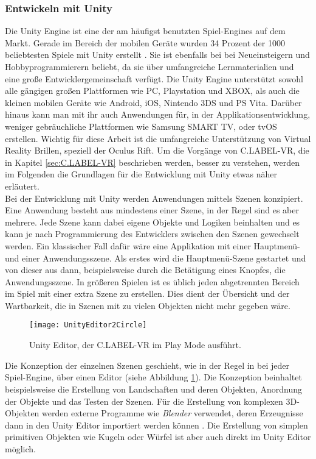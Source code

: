\subsubsection{Entwickeln mit Unity}

Die Unity Engine ist eine der am häufigst benutzten Spiel-Engines auf dem Markt. Gerade im Bereich der mobilen Geräte wurden 34 Prozent der 1000 beliebtesten Spiele mit Unity erstellt \cite{bib:Unity34Percent}. Sie ist ebenfalls bei bei Neueinsteigern und Hobbyprogrammierern beliebt, da sie über umfangreiche Lernmaterialien und eine große Entwicklergemeinschaft verfügt. Die Unity Engine unterstützt sowohl alle gängigen großen Plattformen wie PC, Playstation und XBOX, als auch die kleinen mobilen Geräte wie Android, iOS, Nintendo 3DS und PS Vita. Darüber hinaus kann man mit ihr auch Anwendungen für, in der Applikationsentwicklung, weniger gebräuchliche Plattformen wie Samsung SMART TV, oder tvOS erstellen. Wichtig für diese Arbeit ist die umfangreiche Unterstützung von Virtual Reality Brillen, speziell der Oculus Rift. Um die Vorgänge von C.LABEL-VR, die in Kapitel \ref{sec:C.LABEL-VR} beschrieben werden, besser zu verstehen, werden im Folgenden die Grundlagen für die Entwicklung mit Unity etwas näher erläutert.\\ 

Bei der Entwicklung mit Unity werden Anwendungen mittels Szenen konzipiert. Eine Anwendung besteht aus mindestens einer Szene, in der Regel sind es aber mehrere. Jede Szene kann dabei eigene Objekte und Logiken beinhalten und es kann je nach Programmierung des Entwicklers zwischen den Szenen gewechselt werden. Ein klassischer Fall dafür wäre eine Applikation mit einer Hauptmenü- und einer Anwendungsszene. Als erstes wird die Hauptmenü-Szene gestartet und von dieser aus dann, beispielsweise durch die Betätigung eines Knopfes, die Anwendungsszene. In größeren Spielen ist es üblich jeden abgetrennten Bereich im Spiel mit einer extra Szene zu erstellen. Dies dient der Übersicht und der Wartbarkeit, die in Szenen mit zu vielen Objekten nicht mehr gegeben wäre.\\

\begin{figure}%
	\centering
    \texttt{[image: UnityEditor2Circle]}
    \caption{Unity Editor, der C.LABEL-VR im Play Mode ausführt.}
    \label{fig:UnityEditor}
\end{figure}

Die Konzeption der einzelnen Szenen geschieht, wie in der Regel in bei jeder Spiel-Engine, über einen Editor (siehe Abbildung \ref{fig:UnityEditor}). 
Die Konzeption beinhaltet beispielsweise die Erstellung von Landschaften und deren Objekten, Anordnung der Objekte und das Testen der Szenen. Für die Erstellung von komplexen 3D-Objekten werden externe Programme wie \textit{Blender} verwendet, deren  Erzeugnisse dann in den Unity Editor importiert werden können \cite{bib:Blender}. Die Erstellung von simplen primitiven Objekten wie Kugeln oder Würfel ist aber auch direkt im Unity Editor möglich.

